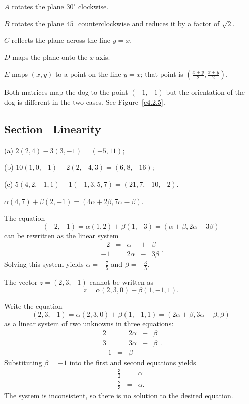 \documentclass{ximera}
\begin{document}
 $A$ rotates the plane $30^\circ$ clockwise.

 $B$ rotates the plane $45^\circ$ counterclockwise and
reduces it by a factor of $\sqrt{2}$.

 $C$ reflects the plane across the line $y = x$.

 $D$ maps the plane onto the $x$-axis.

 $E$ maps $(x,y)$ to a point on the line $y = x$; that
point is $(\frac{x + y}{2}, \frac{x + y}{2})$.


  Both matrices map the dog to the point $(-1,-1)$ but the
orientation of the dog is different in the two cases.  See 
Figure~\ref{c4.2.5}.
\begin{figure}[htb]
     \centerline{%
     }
\end{figure} 


\subsection*{Section~\protect{\ref{S:linearity}} Linearity}

(a) $2(2,4) - 3(3,-1) = (-5,11)$;

(b) $10(1,0,-1) - 2(2,-4,3) = (6,8,-16)$;

(c) $5(4,2,-1,1) - 1(-1,3,5,7) = (21,7,-10,-2)$.

$\alpha (4,7) + \beta (2,-1) = (4\alpha + 2\beta, 7\alpha - \beta)$.

The equation
\[ (-2, -1) = \alpha(1,2) + \beta(1,-3) =
(\alpha + \beta, 2\alpha - 3\beta ) \]
can be rewritten as the linear system
\[ \begin{array}{rrrrr}
-2 & = & \alpha & + & \beta \\
-1 & = & 2\alpha & - & 3\beta\end{array}. \]
Solving this system yields $\alpha = -\frac{7}{5}$ and
$\beta = -\frac{3}{5}$.

\ans The vector $z = (2,3,-1)$ cannot be written as
\[
z = \alpha(2,3,0) + \beta(1,-1,1).
\]

\soln Write the equation
\[ (2,3,-1) = \alpha(2,3,0) + \beta(1,-1,1) = 
(2\alpha + \beta, 3\alpha - \beta, \beta) \]
as a linear system of two unknowns in three equations:
\[ \begin{array}{rrrrr}
2 & = & 2\alpha & + & \beta \\
3 & = & 3\alpha & - & \beta \\
-1 & = & \beta \end{array}. \]
Substituting $\beta = -1$ into the first and second equations
yields
\[ \begin{array}{rcl}
\frac{3}{2} & = & \alpha \\
\frac{2}{3} & = & \alpha. \end{array} \]
The system is inconsistent, so there is no solution to the desired
equation.
\end{document}
